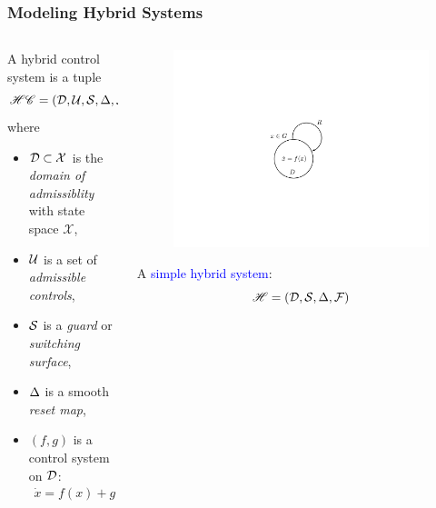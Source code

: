 \documentclass{beamer}
\begin{document}
\begin{frame}
  \frametitle{Modeling Hybrid Systems}
  \begin{columns}
    \begin{column}{.63\textwidth}
      \begin{definition}
        A \alert{hybrid control system} is a tuple \vspace{-.3cm}
        $$\HCS = \hcsystem, \vspace{-.4cm}$$
        where
        \begin{itemize}
        \item
          $\mathcal{D} \subset \mathcal{X}$ is the {\em domain of admissiblity} with state space $\mathcal{X}$,
        \item
          $\mathcal{U}$ is a set of {\em admissible controls},
        \item
          $\mathcal{S}$ is a {\em guard} or {\em switching surface},
        \item
          $\Delta$ is a smooth {\em reset map},
        \item
          $(f, g)$ is a control system on $\mathcal{D}$: \vspace{-3mm}
          \begin{align*}
            \dot{x} = f(x) + g(x) \, u.
          \end{align*}
        \end{itemize}
      \end{definition}
    \end{column}
    \begin{column}{.4\textwidth}
      \begin{figure}
        \centering
        \includegraphics[width=.9\textwidth]{hsystem}\\
      \end{figure}
      A \textcolor{blue}{simple hybrid system}:\vspace{-.3cm}
      $$\mathscr{H} = (\mathcal{D}, \mathcal{S}, \Delta, \mathcal{F})$$
    \end{column}
  \end{columns}
\end{frame}
\end{document}
